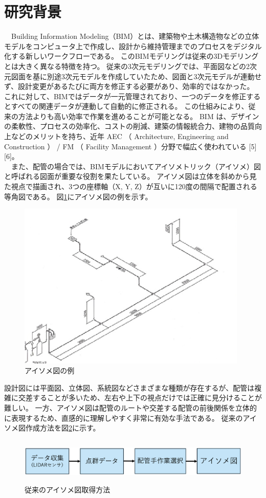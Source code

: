 \section{研究背景}
　Building Information Modeling（BIM）とは、建築物や土木構造物などの立体モデルをコンピュータ上で作成し、設計から維持管理までのプロセスをデジタル化する新しいワークフローである。
このBIMモデリングは従来の3Dモデリングとは大きく異なる特徴を持つ。
従来の3次元モデリングでは、平面図などの2次元図面を基に別途3次元モデルを作成していたため、図面と3次元モデルが連動せず、設計変更があるたびに両方を修正する必要があり、効率的ではなかった。
これに対して、BIMではデータが一元管理されており、一つのデータを修正するとすべての関連データが連動して自動的に修正される。
この仕組みにより、従来の方法よりも高い効率で作業を進めることが可能となる。
BIM は、デザインの柔軟性、プロセスの効率化、コストの削減、建築の情報統合力、建物の品質向上などのメリットを持ち、近年 AEC （ Architecture, Engineering and Construction ） / FM （ Facility Management ）分野で幅広く使われている [5][6]。\\
　また、配管の場合では、BIMモデルにおいてアイソメトリック（アイソメ）図と呼ばれる図面が重要な役割を果たしている。
アイソメ図は立体を斜めから見た視点で描画され、3つの座標軸（X, Y, Z）が互いに120度の間隔で配置される等角図である。
図\ref{fig:f1}にアイソメ図の例を示す。
\begin{figure}[htbt]
	\centering
	 \includegraphics[height=80mm]{Figure/ex_iso.eps}
	 \caption{アイソメ図の例}
	 \label{fig:f1}
\end{figure}
設計図には平面図、立体図、系統図などさまざまな種類が存在するが、配管は複雑に交差することが多いため、左右や上下の視点だけでは正確に見分けることが難しい。
一方、アイソメ図は配管のルートや交差する配管の前後関係を立体的に表現するため、直感的に理解しやすく非常に有効な手法である。
従来のアイソメ図作成方法を図\ref{fig:f2}に示す。
\begin{figure}[htbt]
	\centering
	 \includegraphics[height=22mm]{Figure/existing_research.eps}
	 \caption{従来のアイソメ図取得方法}
	 \label{fig:f2}
\end{figure}


